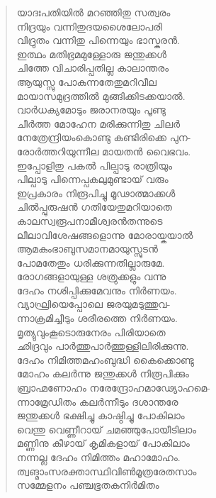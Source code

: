 \begin{verse}
യാദഃപതിയില്‍ മറഞ്ഞിതു സത്വരം\\
നിദ്രയും വന്നിതുദയശൈലോപരി\\
വിദ്രുതം വന്നിതു പിന്നെയും ഭാസ്കരന്‍.\\
ഇത്ഥം മതിഭ്രമമുള്ളോരു ജന്തുക്കള്‍\\
ചിത്തേ വിചാരിപ്പതില്ല കാലാന്തരം\\
ആയുസ്സു പോകുന്നതേതുമറിവീല\\
മായാസമുദ്രത്തില്‍ മുങ്ങിക്കിടക്കയാല്‍.\\
വാര്‍ധക്യമോടും ജരാനരയും പൂണ്ടു\\
ചീര്‍ത്ത മോഹേന മരിക്കുന്നിതു ചിലര്‍\\
നേത്രേന്ദ്രിയംകൊണ്ടു കണ്ടിരിക്കെ പുന-\\
രോര്‍ത്തറിയുന്നീല മായതന്‍ വൈഭവം.\\
ഇപ്പോളിതു പകല്‍ പില്പാടു രാത്രിയും\\
പില്പാടു പിന്നെപ്പകലുമുണ്ടായ് വരും\\
ഇപ്രകാരം നിരൂപിച്ചു മൂഢാത്മാക്കള്‍\\
ചില്‍പ്പുരുഷന്‍ ഗതിയേതുമറിയാതെ\\
കാലസ്വരൂപനാമീശ്വരന്‍തന്നുടെ\\
ലീലാവിശേഷങ്ങളൊന്നു മോരായ്കയാല്‍\\
ആമകുംഭാബുസമാനമായുസ്സുടന്‍\\
പോമതേതും ധരിക്കുന്നതില്ലാരുമേ.\\
രോഗങ്ങളായുള്ള ശത്രുക്കളും വന്നു\\
ദേഹം നശിപ്പിക്കുമേവനും നിര്‍ണയം.\\
വ്യാഘ്രിയെപ്പോലെ ജരയുമടുത്തുവ-\\
ന്നാക്രമിച്ചീടും ശരീരത്തെ നിര്‍ണയം.\\
മൃത്യുവുംകൂടൊരുനേരം പിരിയാതെ\\
ഛിദ്രവും പാര്‍ത്തുപാര്‍ത്തുള്ളിലിരിക്കുന്നു.\\
ദേഹം നിമിത്തമഹംബുദ്ധി കൈക്കൊണ്ടു\\
മോഹം കലര്‍ന്നു ജന്തുക്കള്‍ നിരൂപിക്കും\\
ബ്രാഹ്മണോഹം നരേന്ദ്രോഹമാഢ്യോഹമെ-\\
ന്നാമ്രേഡിതം കലര്‍ന്നീടും ദശാന്തരേ\\
ജന്തുക്കള്‍ ഭക്ഷിച്ചു കാഷ്ഠിച്ചു പോകിലാം\\
വെന്തു വെണ്ണീറായ് ചമഞ്ഞുപോയീടിലാം\\
മണ്ണിനു കീഴായ് കൃമികളായ് പോകിലാം\\
നന്നല്ല ദേഹം നിമിത്തം മഹാമോഹം.\\
ത്വങ്മാംസരക്താസ്ഥിവിണ്‍മൂത്രരേതസാം\\
സമ്മേളനം പഞ്ചഭൂതകനിര്‍മിതം\\

\end{verse}
